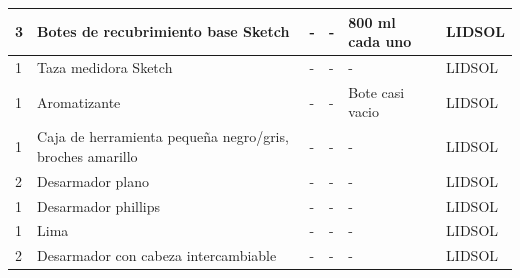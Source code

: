 \documentclass[a4paper,11pt]{article}                 %
\begin{document}
\begin{longtable}{|p{}|p{}|p{}|p{}|p{}|p{}|}
3                          & Botes de recubrimiento base Sketch                                                    & -                                                                            & -                        & 800 ml cada uno                             & LIDSOL                        \\ \hline
1                          & Taza medidora Sketch                                                                  & -                                                                            & -                        & -                                           & LIDSOL                        \\ \hline
1                          & Aromatizante                                                                          & -                                                                            & -                        & Bote casi vacio                             & LIDSOL                        \\ \hline
1                          & Caja de herramienta pequeña negro/gris, broches amarillo                              & -                                                                            & -                        & -                                           & LIDSOL                        \\ \hline
2                          & Desarmador plano                                                                      & -                                                                            & -                        & -                                           & LIDSOL                        \\ \hline
1                          & Desarmador phillips                                                                   & -                                                                            & -                        & -                                           & LIDSOL                        \\ \hline
1                          & Lima                                                                                  & -                                                                            & -                        & -                                           & LIDSOL                        \\ \hline
2                          & Desarmador con cabeza intercambiable                                                  & -                                                                            & -                        & -                                           & LIDSOL                        \\ \hline

\end{longtable}
\end{document}
